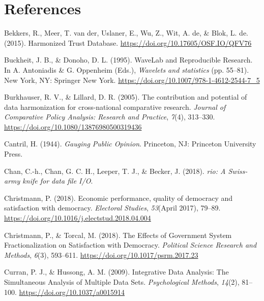\documentclass[12pt,]{article}
\begin{document}
\normalsize

\hypertarget{references}{%
\section{References}\label{references}}

\renewcommand{\baselinestretch}{1}\normalsize
\parindent 0in
\leftskip 0.2in

\parindent -0.2in

\hypertarget{refs}{}
\leavevmode\hypertarget{ref-Bekkers2015}{}%
Bekkers, R., Meer, T. van der, Uslaner, E., Wu, Z., Wit, A. de, \& Blok, L. de. (2015). Harmonized Trust Database. \url{https://doi.org/10.17605/OSF.IO/QFV76}

\leavevmode\hypertarget{ref-Buckheit1995}{}%
Buckheit, J. B., \& Donoho, D. L. (1995). WaveLab and Reproducible Research. In A. Antoniadis \& G. Oppenheim (Eds.), \emph{Wavelets and statistics} (pp. 55--81). New York, NY: Springer New York. \url{https://doi.org/10.1007/978-1-4612-2544-7_5}

\leavevmode\hypertarget{ref-Burkhauser2005}{}%
Burkhauser, R. V., \& Lillard, D. R. (2005). The contribution and potential of data harmonization for cross-national comparative research. \emph{Journal of Comparative Policy Analysis: Research and Practice}, \emph{7}(4), 313--330. \url{https://doi.org/10.1080/13876980500319436}

\leavevmode\hypertarget{ref-Cantril1944}{}%
Cantril, H. (1944). \emph{Gauging Public Opinion}. Princeton, NJ: Princeton University Press.

\leavevmode\hypertarget{ref-rio}{}%
Chan, C.-h., Chan, G. C. H., Leeper, T. J., \& Becker, J. (2018). \emph{rio: A Swiss-army knife for data file I/O}.

\leavevmode\hypertarget{ref-Christmann2018}{}%
Christmann, P. (2018). Economic performance, quality of democracy and satisfaction with democracy. \emph{Electoral Studies}, \emph{53}(April 2017), 79--89. \url{https://doi.org/10.1016/j.electstud.2018.04.004}

\leavevmode\hypertarget{ref-Christmann2018a}{}%
Christmann, P., \& Torcal, M. (2018). The Effects of Government System Fractionalization on Satisfaction with Democracy. \emph{Political Science Research and Methods}, \emph{6}(3), 593--611. \url{https://doi.org/10.1017/psrm.2017.23}

\leavevmode\hypertarget{ref-Curran2009}{}%
Curran, P. J., \& Hussong, A. M. (2009). Integrative Data Analysis: The Simultaneous Analysis of Multiple Data Sets. \emph{Psychological Methods}, \emph{14}(2), 81--100. \url{https://doi.org/10.1037/a0015914}
\end{document}
